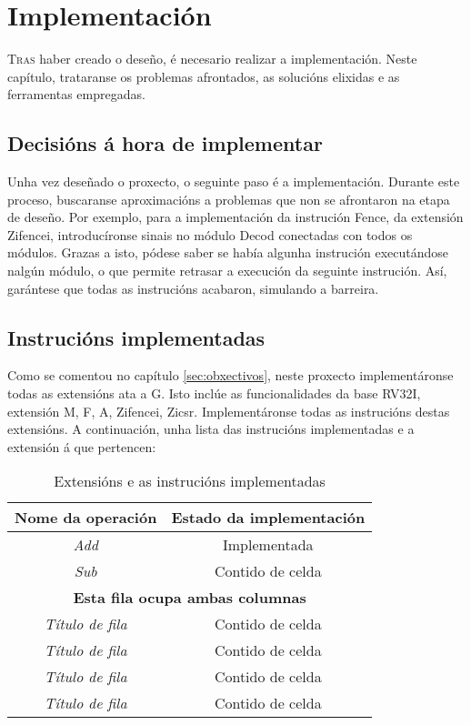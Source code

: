 \chapter{Implementación}
\label{chap:implementacion}

\lettrine{T}{ras} haber creado o deseño, é necesario realizar a implementación. Neste capítulo, trataranse os problemas afrontados, as solucións elixidas e as ferramentas empregadas.

\section{Decisións á hora de implementar}\label{sec:decisions}
Unha vez deseñado o proxecto, o seguinte paso é a implementación. Durante este proceso, buscaranse aproximacións a problemas que non se afrontaron na etapa de deseño. Por exemplo, para a implementación da instrución Fence, da extensión Zifencei, introducíronse sinais no módulo Decod conectadas con todos os módulos. Grazas a isto, pódese saber se había algunha instrución executándose nalgún módulo, o que permite retrasar a execución da seguinte instrución. Así, garántese que todas as instrucións acabaron, simulando a barreira.


\section{Instrucións implementadas}\label{sec:intrucions_implt}
Como se comentou no capítulo \ref{sec:obxectivos}, neste proxecto implementáronse todas as extensións ata a G. Isto inclúe as funcionalidades da base RV32I, extensión M, F, A, Zifencei, Zicsr. Implementáronse todas as instrucións destas extensións. A continuación, unha lista das instrucións implementadas e a extensión á que pertencen:
\begin{table}[hp!]
  \centering
  \begin{tabular}{c|c}
    \rowcolor{udcpink!25}
    \textbf{Nome da operación} & \textbf{Estado da implementación} \\\hline
    \textit{Add} & Implementada \\
    \textit{Sub} & Contido de celda \\
    \multicolumn{2}{c}{\textbf{Esta fila ocupa ambas columnas}} \\
    \textit{Título de fila} & Contido de celda \\
    \textit{Título de fila} & Contido de celda \\
    \textit{Título de fila} & Contido de celda \\
    \textit{Título de fila} & Contido de celda \\
  \end{tabular}
  \caption{Extensións e as instrucións implementadas}
  \label{tab:intrucions_implementadas}
\end{table}


